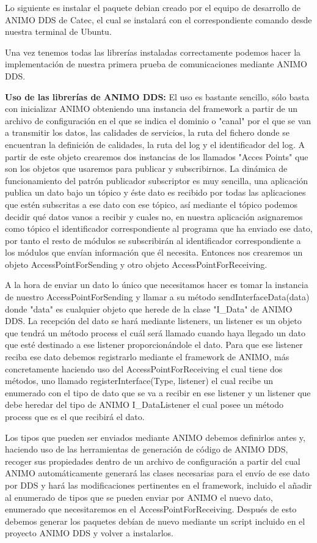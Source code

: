 \documentclass[12pt,a4paper,spanish]{book} %
\begin{document}
Lo siguiente es instalar el paquete debian creado por el equipo de desarrollo de ANIMO DDS de Catec, el cual se instalará con el correspondiente comando desde nuestra terminal de Ubuntu.

Una vez tenemos todas las librerías instaladas correctamente podemos hacer la implementación de nuestra primera prueba de comunicaciones mediante ANIMO DDS.

\textbf{Uso de las librerías de ANIMO DDS: }El uso es bastante sencillo, sólo basta con inicializar ANIMO obteniendo una instancia del framework a partir de un archivo de configuración en el que se indica el dominio o "canal" por el que se van a transmitir los datos, las calidades de servicios, la ruta del fichero donde se encuentran la definición de calidades, la ruta del log y el identificador del log. A partir de este objeto crearemos dos instancias de los llamados "Acces Points" que son los objetos que usaremos para publicar y subscribirnos. La dinámica de funcionamiento del patrón publicador subscriptor es muy sencilla, una aplicación publica un dato bajo un tópico y éste dato es recibido por todas las aplicaciones que estén subscritas a ese dato con ese tópico, así mediante el tópico podemos decidir qué datos vanos a recibir y cuales no, en nuestra aplicación asignaremos como tópico el identificador correspondiente al programa que ha enviado ese dato, por tanto el resto de módulos se subscribirán al identificador correspondiente a los módulos que envían información que él necesita. Entonces nos crearemos un objeto AccessPointForSending y otro objeto AccessPointForReceiving.

A la hora de enviar un dato lo único que necesitamos hacer es tomar la instancia de nuestro AccessPointForSending y llamar a su método sendInterfaceData(data) donde "data" es cualquier objeto que herede de la clase "I\_Data" de ANIMO DDS. La recepción del dato se hará mediante listeners, un listener es un objeto que tendrá un método process el cuál será llamado cuando haya llegado un dato que esté destinado a ese listener proporcionándole el dato. Para que ese listener reciba ese dato debemos registrarlo mediante el framework de ANIMO, más concretamente haciendo uso del AccessPointForReceiving el cual tiene dos métodos, uno llamado registerInterface(Type, listener) el cual recibe un enumerado con el tipo de dato que se va a recibir en ese listener y un listener que debe heredar del tipo de ANIMO I\_DataListener el cual posee un método process que es el que recibirá el dato.

Los tipos que pueden ser enviados mediante ANIMO debemos definirlos antes y, haciendo uso de las herramientas de generación de código de ANIMO DDS, recoger sus propiedades dentro de un archivo de configuración a partir del cual ANIMO automáticamente generará las clases necesarias para el envío de ese dato por DDS y hará las modificaciones pertinentes en el framework, incluido el añadir al enumerado de tipos que se pueden enviar por ANIMO el nuevo dato, enumerado que necesitaremos en el AccessPointForReceiving. Después de esto debemos generar los paquetes debían de nuevo mediante un script incluido en el proyecto ANIMO DDS y volver a instalarlos.
\end{document}
